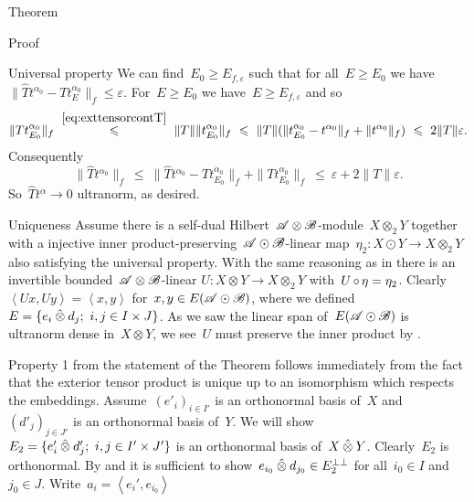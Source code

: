\begin{parsec}
\begin{point}{Theorem}
\begin{point}{Proof}
\begin{point}{Universal property}
We can find~$E_0 \geq E_{f,\varepsilon}$
such that for all~$E \geq E_0$
we have~$\| \hat{T} t^{\alpha_0} -T t^{\alpha_0}_E \|_f \leq \varepsilon$.
For~$E \geq E_0$ we have~$E \geq E_{f,\varepsilon}$ and so
\begin{equation*}
 \|T t^{\alpha_0}_{E_0}\|_f
 \  \overset{\eqref{eq:exttensorcontT}}{\leq}\  \|T\| \|t^{\alpha_0}_{E_0}\|_f
  \  \leq\ \|T\|
  ( \|t^{\alpha_0}_{E_0} - t^{\alpha_0}\|_f +
  \| t^{\alpha_0} \|_f)
   \ \leq\  2 \|T\| \varepsilon.
\end{equation*}
    Consequently
\begin{equation*}
    \|\hat{T} t^{\alpha_0} \|_f \ \leq  \ 
    \|\hat{T} t^{\alpha_0} - T t^{\alpha_0}_{E_0} \|_f
                + \|T t^{\alpha_0}_{E_0}\|_f
    \ \leq\  \varepsilon + 2\|T\|\varepsilon.
\end{equation*}
So~$\hat{T}t^\alpha \to 0$ ultranorm, as desired.
\end{point}
\begin{point}[ext-tensor-uniqueness]{Uniqueness}%
Assume there is a self-dual Hilbert~$\scrA\otimes\scrB$-module~$X \otimes_2 Y$
    together with a injective
    inner product-preserving~$\scrA\odot\scrB$-linear
    map~$\eta_2 \colon X \odot Y \to X \otimes_2 Y$
    also satisfying the universal property.
With the same reasoning as in 
    there is an invertible bounded~$\scrA\otimes\scrB$-linear
    $U\colon X \otimes Y \to X \otimes_2 Y$
    with~$U \after \eta = \eta_2$.
Clearly~$\left<Ux, U y\right> = \left<x,y\right>$
    for~$x,y \in E (\scrA\odot\scrB)$,
    where we defined~$E = \{e_i \hotimes d_j; \ i,j \in I\times J\}$.
As we saw the linear span of~$E (\scrA\odot\scrB)$
    is ultranorm dense in~$X \otimes Y$,
    we see~$U$ must preserve the inner product by .
\end{point}
\begin{point}%
Property 1 from the statement of the Theorem follows immediately
    from the fact that the exterior tensor product is unique
    up to an isomorphism which respects the embeddings.
Assume~$(e'_i)_{i \in I'}$ is an orthonormal basis of~$X$
    and~$(d'_j)_{j \in J'}$ is an orthonormal basis of~$Y$.
We will show $E_2 =\{ e'_i \hotimes d'_j; \ i,j \in I'\times J'\}$
is an orthonormal basis of~$X \hotimes Y$.
Clearly~$E_2$ is orthonormal.
By  and 
    it is sufficient to show~$e_{i_0} \hotimes d_{j_0} \in E_2^{\perp\perp}$
    for all~$i_0 \in I$ and $j_0 \in J$.
Write~$a_i = \left<e_i',e_{i_0}\right>$

\end{point}
\end{point}
\end{point}
\end{parsec}
